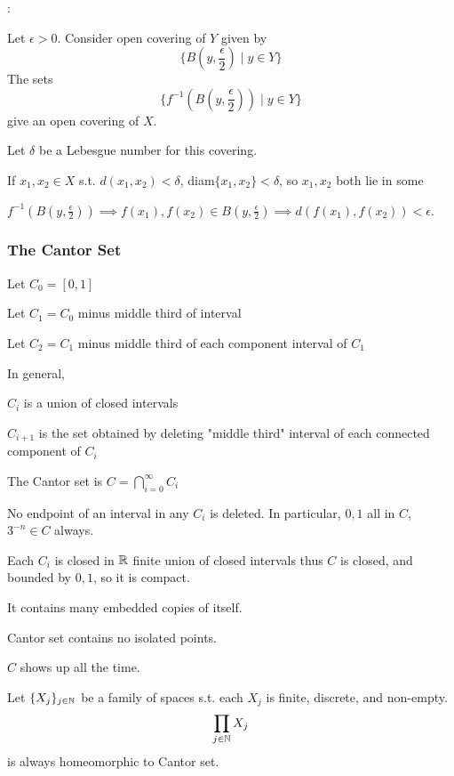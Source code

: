 \begin{thmpf}:

    Let $\epsilon > 0$. Consider open covering of $Y$ given by
    \[\{B(y,\frac{\epsilon}{2}) \mid y \in Y\}\]
    The sets
    \[\{f^{-1}(B(y,\frac{\epsilon}{2})) \mid y \in Y\}\]
    give an open covering of $X$.

    Let $\delta$ be a Lebesgue number for this covering. 
    
    If $x_1,x_2 \in X$ s.t. $d(x_1,x_2) < \delta$, diam$\{x_1,x_2\} < \delta$, so $x_1,x_2$ both lie in some 
    
    $f^{-1}(B(y,\frac{\epsilon}{2})) \implies f(x_1),f(x_2) \in B(y, \frac{\epsilon}{2}) \implies d(f(x_1),f(x_2)) < \epsilon$.
\end{thmpf}

\subsubsection{The Cantor Set}
Let $C_0=[0,1]$

Let $C_1=C_0$ minus middle third of interval

Let $C_2=C_1$ minus middle third of each component interval of $C_1$

In general,

$C_i$ is a union of closed intervals

$C_{i+1}$ is the set obtained by deleting "middle third" interval of each connected component of $C_i$

The Cantor set is $C=\displaystyle\bigcap_{i=0}^\infty C_i$

No endpoint of an interval in any $C_i$ is deleted. In particular, $0,1$ all in $C$, $3^{-n} \in C$ always.

Each $C_i$ is closed in $\mathbb{R}$ finite union of closed intervals thus $C$ is closed, and bounded by $0,1$, so it is compact.

It contains many embedded copies of itself.


Cantor set contains no isolated points.


$C$ shows up all the time.

Let $\{X_j\}_{j \in \mathbb{N}}$ be a family of spaces s.t. each $X_j$ is finite, discrete, and non-empty.
\[\prod_{j \in \mathbb{N}}X_j\]
is always homeomorphic to Cantor set.

